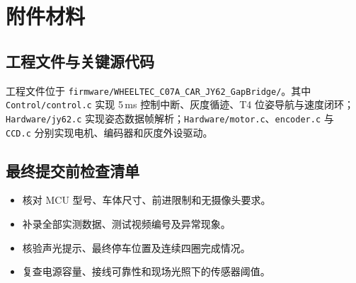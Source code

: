 \documentclass[12pt,a4paper,fontset=fandol]{ctexart}
\newcommand{\code}[1]{\texttt{\small #1}}
\begin{document}
\section{附件材料}
\subsection{工程文件与关键源代码}
工程文件位于 \code{firmware/WHEELTEC\_C07A\_CAR\_JY62\_GapBridge/}。其中 \code{Control/control.c} 实现 5\,ms 控制中断、灰度循迹、T4 位姿导航与速度闭环；\code{Hardware/jy62.c} 实现姿态数据帧解析；\code{Hardware/motor.c}、\code{encoder.c} 与 \code{CCD.c} 分别实现电机、编码器和灰度外设驱动。

\subsection{最终提交前检查清单}
\begin{itemize}
  \item[$\square$] 核对 MCU 型号、车体尺寸、前进限制和无摄像头要求。
  \item[$\square$] 补录全部实测数据、测试视频编号及异常现象。
  \item[$\square$] 核验声光提示、最终停车位置及连续四圈完成情况。
  \item[$\square$] 复查电源容量、接线可靠性和现场光照下的传感器阈值。
\end{itemize}
\end{document}

